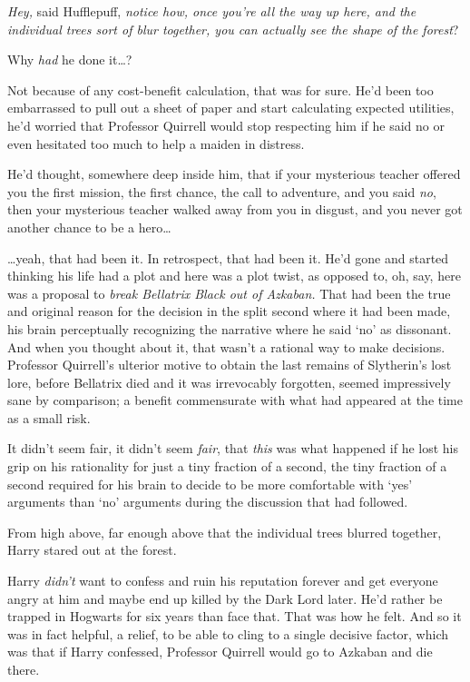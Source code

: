 \emph{Hey,} said Hufflepuff, \emph{notice how, once you're all the way up here, and the individual trees sort of blur together, you can actually see the shape of the forest}?

Why \emph{had} he done it{\ldots}?

Not because of any cost-benefit calculation, that was for sure. He'd been too embarrassed to pull out a sheet of paper and start calculating expected utilities, he'd worried that Professor Quirrell would stop respecting him if he said no or even hesitated too much to help a maiden in distress.

He'd thought, somewhere deep inside him, that if your mysterious teacher offered you the first mission, the first chance, the call to adventure, and you said \emph{no}, then your mysterious teacher walked away from you in disgust, and you never got another chance to be a hero{\ldots}

{\ldots}yeah, that had been it. In retrospect, that had been it. He'd gone and started thinking his life had a plot and here was a plot twist, as opposed to, oh, say, here was a proposal to \emph{break Bellatrix Black out of Azkaban.} That had been the true and original reason for the decision in the split second where it had been made, his brain perceptually recognizing the narrative where he said `no' as dissonant. And when you thought about it, that wasn't a rational way to make decisions. Professor Quirrell's ulterior motive to obtain the last remains of Slytherin's lost lore, before Bellatrix died and it was irrevocably forgotten, seemed impressively sane by comparison; a benefit commensurate with what had appeared at the time as a small risk.

It didn't seem fair, it didn't seem \emph{fair}, that \emph{this} was what happened if he lost his grip on his rationality for just a tiny fraction of a second, the tiny fraction of a second required for his brain to decide to be more comfortable with `yes' arguments than `no' arguments during the discussion that had followed.

From high above, far enough above that the individual trees blurred together, Harry stared out at the forest.

Harry \emph{didn't} want to confess and ruin his reputation forever and get everyone angry at him and maybe end up killed by the Dark Lord later. He'd rather be trapped in Hogwarts for six years than face that. That was how he felt. And so it was in fact helpful, a relief, to be able to cling to a single decisive factor, which was that if Harry confessed, Professor Quirrell would go to Azkaban and die there.

